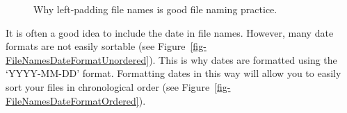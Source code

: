 \documentclass[
  letterpaper,
  DIV=11,
  numbers=noendperiod]{scrreprt}
\begin{document}
\begin{figure}
\begin{minipage}{0.50\linewidth}
{}


\end{minipage}%

\caption{\label{fig-NumberPadding}Why left-padding file names is good
file naming practice.}

\end{figure}%

It is often a good idea to include the date in file names. However, many
date formats are not easily sortable (see
Figure~\ref{fig-FileNamesDateFormatUnordered}). This is why dates are
formatted using the `YYYY-MM-DD' format. Formatting dates in this way
will allow you to easily sort your files in chronological order (see
Figure~\ref{fig-FileNamesDateFormatOrdered}).
\end{document}

